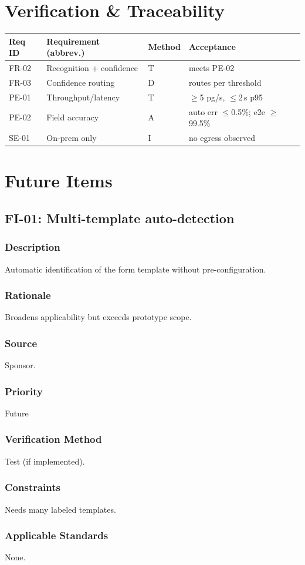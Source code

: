\documentclass[11pt,letterpaper]{article}
\newcommand{\req}[7]{\subsubsection*{Description} #1 \subsubsection*{Rationale} #2
  \subsubsection*{Source} #3 \subsubsection*{Priority} #4
  \subsubsection*{Verification Method} #5 \subsubsection*{Constraints} #6
  \subsubsection*{Applicable Standards} #7}
\begin{document}
\section{Verification \& Traceability}
\begin{longtable}{ | p{1.4cm} | p{6.6cm} | p{1.4cm} | p{3cm} |}\hline
\textbf{Req ID} & \textbf{Requirement (abbrev.)} & \textbf{Method} & \textbf{Acceptance} \\ \hline\endhead
FR-02 & Recognition + confidence & T & meets PE-02 \\ \hline
FR-03 & Confidence routing & D & routes per threshold \\ \hline
PE-01 & Throughput/latency & T & $\geq$5 pg/s, $\leq$2\,s p95 \\ \hline
PE-02 & Field accuracy & A & auto err $\leq$0.5\%; e2e $\geq$99.5\% \\ \hline
SE-01 & On-prem only & I & no egress observed \\ \hline
\end{longtable}

\section{Future Items}
\subsection{FI-01: Multi-template auto-detection}
\req{Automatic identification of the form template without pre-configuration.}
{Broadens applicability but exceeds prototype scope.}
{Sponsor.}{Future}{Test (if implemented).}{Needs many labeled templates.}{None.}


{}
\end{document}
